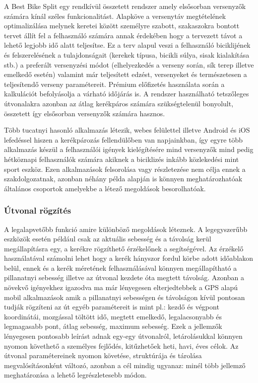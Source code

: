 A Best Bike Split \cite{bestbikesplit} egy rendkívül összetett rendszer amely elsősorban versenyzők számára kínál széles funkcionalitást. Alapköve a versenytáv megtételének optimalizálása melynek keretei között személyre szabott, szakaszokra bontott tervet állít fel a felhasználó számára annak érdekében hogy a tervezett távot a lehető legjobb idő alatt teljesítse. Ez a terv alapul veszi a felhasználó biciklijének és felszerelésének a tulajdonságait (kerekek típusa, bicikli súlya, sisak kialakítása stb.) a preferált versenyzési módot (elhelyezkedés a verseny során, sík terep illetve emelkedő esetén) valamint már teljesített edzést, versenyeket és természetesen a teljesítendő verseny paramétereit. Prémium előfizetés használata során a kalkulációt befolyásolja a várható időjárás is. A rendszer használható tetszőleges útvonalakra azonban az átlag kerékpáros számára szükségtelenül bonyolult, összetett így elsősorban versenyzők számára hasznos.

Több tucatnyi hasonló alkalmazás létezik, webes felülettel illetve Android és iOS lefedéssel hiszen a kerékpározás fellendülőben van napjainkban, így egyre több alkalmazás készül a felhasználói igények kielégítésére mind versenyzők mind pedig hétköznapi felhasználók számára akiknek a biciklizés inkább közlekedési mint sport eszköz. Ezen alkalmazások felsorolása vagy részletezése nem célja ennek a szakdolgozatnak, azonban néhány példa alapján is könnyen meghatározhatóak általános csoportok amelyekbe a létező megoldások besorolhatóak.

\subsubsection{Útvonal rögzítés} 
A legalapvetőbb funkció amire különböző megoldások léteznek. A legegyszerűbb eszközök esetén például csak az aktuális sebesség és a távolság kerül megállapításra egy, a kerékre rögzíthető érzékelőnek a segítségével. Az érzékelő használatával számolni lehet hogy a kerék hányszor fordul körbe adott időablakon belül, ennek és a kerék méretének felhasználásával könnyen megállapítható a pillanatnyi sebesség illetve az útvonal kezdete óta megtett távolság. Azonban a növekvő igényekhez igazodva ma már lényegesen elterjedtebbek a GPS alapú mobil alkalmazások amik a pillanatnyi sebességen és távolságon kívül pontosan tudják rögzíteni az út egyéb paramétereit is mint pl.: kezdő és végpont koordinátái, mozgással töltött idő, megtett emelkedő, legalacsonyabb és legmagasabb pont, átlag sebesség, maximum sebesség. Ezek a jellemzők lényegesen pontosabb leírást adnak egy-egy útvonalról, letárolásukkal könnyen nyomon követhető a személyes fejlődés, kitűzhetőek heti, havi, éves célok. Az útvonal paramétereinek nyomon követése, struktúrája és tárolása megvalósításonként változó, azonban a cél mindig ugyanaz: minél több jellemző meghatározása a lehető legrészletesebb módon.

